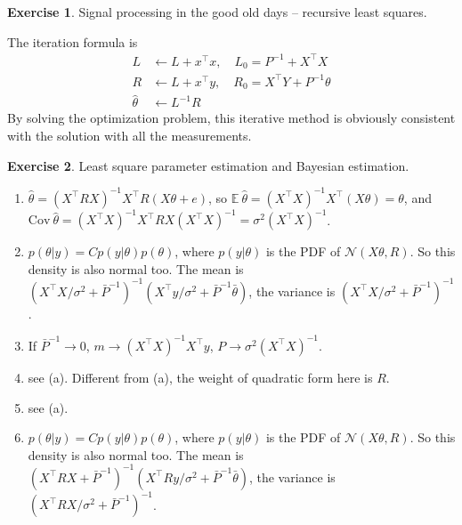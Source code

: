 \documentclass[11pt,a4paper]{report}
\theoremstyle{definition}\newtheorem{exercise}{Exercise}[chapter]
\begin{document}
\begin{exercise}Signal processing in the good old days -- recursive least squares.\\
\end{exercise}
\begin{answer}
    The iteration formula is 
    \begin{align}
        L&\leftarrow L+x^\top x,\quad L_0=P^{-1}+X^\top X\\
        R&\leftarrow L+x^\top y,\quad R_0=X^\top Y +P^{-1}\theta\\
        \hat\theta &\leftarrow L^{-1}R
    \end{align}
    By solving the optimization problem, this iterative method is obviously consistent with the solution with all the measurements.
\end{answer}


\begin{exercise}Least square parameter estimation and Bayesian estimation.\\
\end{exercise}
\begin{answer}
\begin{enumerate}[label=(\alph*)]
    \item $\hat\theta=(X^\top R X)^{-1}X^\top R(X\theta+e)$, so $\mathbb{E}~\hat\theta=(X^\top X)^{-1}X^\top(X\theta)=\theta$, and $\text{Cov}~\hat\theta=(X^\top X)^{-1}X^\top R X (X^\top X)^{-1}=\sigma^2 (X^\top X)^{-1}$.
    \item $p(\theta|y)=C p(y|\theta) p(\theta)$, where $p(y|\theta)$ is the PDF of $\mathcal{N}(X\theta,R)$. So this density is also normal too. The mean is $(X^\top X/\sigma^2 +\bar P^{-1})^{-1}(X^\top y/\sigma^2+\bar P^{-1}\bar\theta)$, the variance is $(X^\top X/\sigma^2 +\bar P^{-1})^{-1}$.
    \item If $\bar P^{-1}\rightarrow 0$, $m\rightarrow (X^\top X)^{-1}X^\top y$, $P\rightarrow \sigma^2 (X^\top X)^{-1}$.
    \item see (a). Different from (a), the weight of quadratic form here is $R$.
    \item see (a).
    \item $p(\theta|y)=C p(y|\theta) p(\theta)$, where $p(y|\theta)$ is the PDF of $\mathcal{N}(X\theta,R)$. So this density is also normal too. The mean is $(X^\top R X +\bar P^{-1})^{-1}(X^\top R y/\sigma^2+\bar P^{-1}\bar\theta)$, the variance is $(X^\top R X/\sigma^2 +\bar P^{-1})^{-1}$.
\end{enumerate}
\end{answer}
\end{document}
